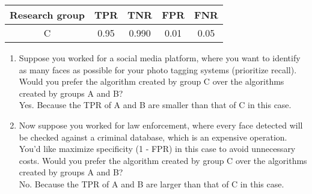 \begin{enumerate}
\begin{center}
\begin{tabular}{|c|c|c|c|c|}

\hline
\textbf{Research group} & \textbf{TPR} & \textbf{TNR} & \textbf{FPR} & \textbf{FNR}  \\
\hline 
C & 0.95 & 0.990 & 0.01 & 0.05 \\
\hline

\end{tabular}
\end{center}

\begin{enumerate}
    \item Suppose you worked for a social media platform, where you want to identify as many faces as possible for your photo tagging systems (prioritize recall). Would you prefer the algorithm created by group C over the algorithms created by groups A and B?\\
    
    Yes. Because the TPR of A and B are smaller than that of C in this case.
    
    \item Now suppose you worked for law enforcement, where every face detected will be checked against a criminal database, which is an expensive operation. You'd like maximize specificity (1 - FPR) in this case to avoid unnecessary costs. Would you prefer the algorithm created by group C over the algorithms created by groups A and B?\\
    
    No. Because the TPR of A and B are larger than that of C in this case.
    
\end{enumerate}


\end{enumerate}